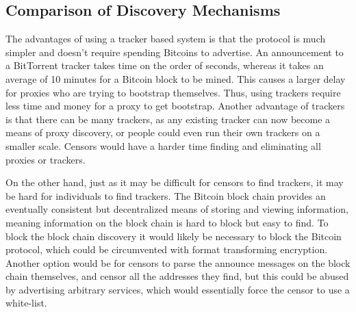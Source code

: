 \subsection{Comparison of Discovery Mechanisms}
The advantages of using a tracker based system is that the protocol is much simpler and doesn't require spending Bitcoins to advertise. An announcement to a BitTorrent tracker takes time on the order of seconds, whereas it takes an average of 10 minutes for a Bitcoin block to be mined. This causes a larger delay for proxies who are trying to bootstrap themselves. Thus, using trackers require less time and money for a proxy to get bootstrap. Another advantage of trackers is that there can be many trackers, as any existing tracker can now become a means of proxy discovery, or people could even run their own trackers on a smaller scale. Censors would have a harder time finding and eliminating all proxies or trackers.

On the other hand, just as it may be difficult for censors to find trackers, it may be hard for individuals to find trackers. The Bitcoin block chain provides an eventually consistent but decentralized means of storing and viewing information, meaning information on the block chain is hard to block but easy to find. To block the block chain discovery it would likely be necessary to block the Bitcoin protocol, which could be circumvented with format transforming encryption. Another option would be for censors to parse the announce messages on the block chain themselves, and censor all the addresses they find, but this could be abused by advertising arbitrary services, which would essentially force the censor to use a white-list.

